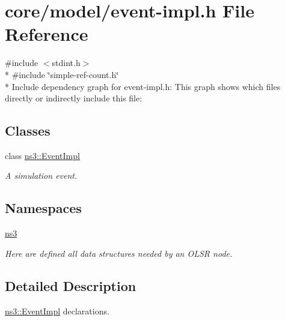 \hypertarget{event-impl_8h}{}\section{core/model/event-\/impl.h File Reference}
\label{event-impl_8h}
{\ttfamily \#include $<$stdint.\+h$>$}\\*
{\ttfamily \#include \char`\"{}simple-\/ref-\/count.\+h\char`\"{}}\\*
Include dependency graph for event-\/impl.h\+:
This graph shows which files directly or indirectly include this file\+:
\subsection*{Classes}
\begin{DoxyCompactItemize}
\item 
class \hyperlink{classns3_1_1EventImpl}{ns3\+::\+Event\+Impl}
\begin{DoxyCompactList}\small\item\em A simulation event. \end{DoxyCompactList}\end{DoxyCompactItemize}
\subsection*{Namespaces}
\begin{DoxyCompactItemize}
\item 
 \hyperlink{namespacens3}{ns3}
\begin{DoxyCompactList}\small\item\em Here are defined all data structures needed by an O\+L\+SR node. \end{DoxyCompactList}\end{DoxyCompactItemize}


\subsection{Detailed Description}
\hyperlink{classns3_1_1EventImpl}{ns3\+::\+Event\+Impl} declarations. 